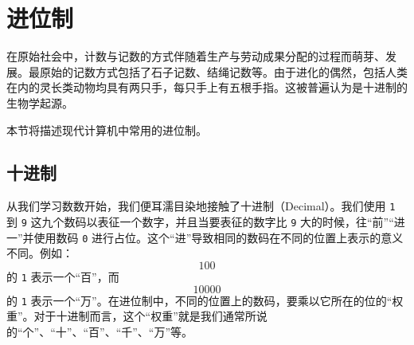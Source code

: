 \section{进位制}\label{sec:NumberSystemBasics/positional-notation}
    在原始社会中，计数与记数的方式伴随着生产与劳动成果分配的过程而萌芽、发展。最原始的记数方式包括了石子记数、结绳记数等。由于进化的偶然，包括人类在内的灵长类动物均具有两只手，每只手上有五根手指。这被普遍认为是十进制的生物学起源。

    本节将描述现代计算机中常用的进位制。

    \subsection{十进制}\label{subsec:NumberSystemBasics/positional-notation/decimal}
        从我们学习数数开始，我们便耳濡目染地接触了十进制（Decimal）。我们使用 \texttt{1} 到 \texttt{9} 这九个数码以表征一个数字，并且当要表征的数字比 \texttt{9} 大的时候，往“前”“进一”并使用数码 \texttt{0} 进行占位。这个“进”导致相同的数码在不同的位置上表示的意义不同。例如：\[100\]的 \texttt{1} 表示一个“百”，而\[10000\]的 \texttt{1} 表示一个“万”。在进位制中，不同的位置上的数码，要乘以它所在的位的“权重”。对于十进制而言，这个“权重”就是我们通常所说的“个”、“十”、“百”、“千”、“万”等。
